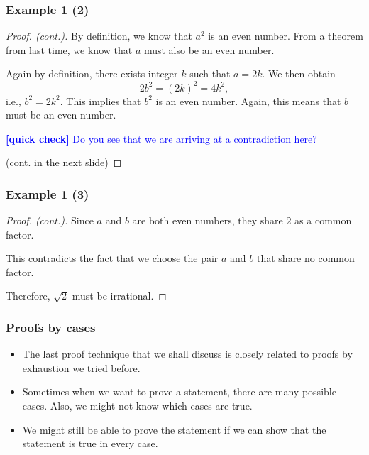 \begin{frame}\frametitle{Example 1 (2)}
  \begin{proof}[Proof. (cont.)]
    By definition, we know that $a^2$ is an even number.  From a
    theorem from last time, we know that $a$ must also be an even
    number. \pause

    Again by definition, there exists integer $k$ such that $a = 2k$.
    We then obtain
    \[2b^2 = (2k)^2 = 4k^2,\]
    i.e., $b^2 = 2k^2$.  \pause This implies that $b^2$ is an even number.
    Again, this means that $b$ must be an even number. \pause

    \vspace{0.1in}
    \textcolor{blue}{{\bf [quick check] } Do you see that we are
      arriving at a contradiction here?}
    \vspace{0.1in}
    \pause

    (cont. in the next slide)
  \end{proof}
\end{frame}

\begin{frame}\frametitle{Example 1 (3)}
  \begin{proof}[Proof. (cont.)]
    Since $a$ and $b$ are both even numbers, they share $2$ as a
    common factor. \pause

    This contradicts the fact that we choose the pair $a$ and $b$ that
    share no common factor. \pause

    Therefore, $\sqrt{2}$ must be irrational.
  \end{proof}
\end{frame}

\begin{frame}\frametitle{Proofs by cases}
  \begin{itemize}
  \item The last proof technique that we shall discuss is closely
    related to proofs by exhaustion we tried before.
  \item Sometimes when we want to prove a statement, there are many
    possible cases.  Also, we might not know which cases are true.
  \item We might still be able to prove the statement if we can show
    that the statement is true in every case.
  \end{itemize}
\end{frame}
  
